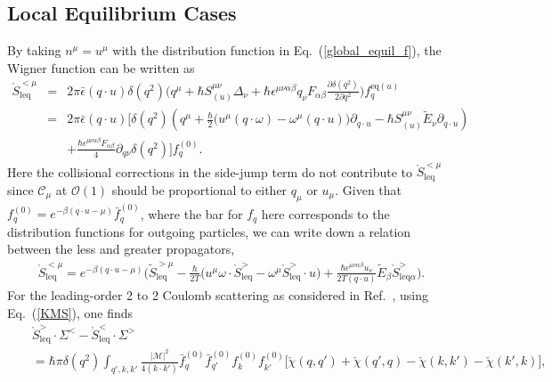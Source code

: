 \documentclass[aps,prd,showkeys,preprint,amsmath,amssymb,nofootinbib]{revtex4-1}
\begin{document}
\subsection{Local Equilibrium Cases}\label{local}
By taking $n^{\mu}=u^{\mu}$ with the distribution function in Eq.~(\ref{global_equil_f}), the Wigner function can be written as
\begin{eqnarray}\label{L_equil_Wigner}\nonumber
	\grave{S}_{\text{leq}}^{<\mu}&=&2\pi\bar{\epsilon}(q\cdot u)\delta(q^2)\Bigg(q^{\mu}
	+\hbar S^{\mu\nu}_{(u)}\Delta_{\nu}
	+\hbar\epsilon^{\mu\nu\alpha\beta}q_{\nu}F_{\alpha\beta}\frac{\partial\delta(q^2)}{2\partial q^2}
	\Bigg)f^{\text{eq}(u)}_q
	\\\nonumber
	&=&2\pi\bar{\epsilon}(q\cdot u)\Bigg[\delta(q^2)\left(q^{\mu}+\frac{\hbar}{2}\big(u^{\mu}(q\cdot\omega)-\omega^{\mu}(q\cdot u)\big)\partial_{q\cdot u}-\hbar S^{\mu\nu}_{(u)}\tilde{E}_{\nu}
	\partial_{q\cdot u}
	\right)
	\\
	&&
	+\frac{\hbar\epsilon^{\mu\nu\alpha\beta}F_{\alpha\beta}}{4}\partial_{q\nu}\delta(q^2)
	\Bigg]f^{(0)}_q.
\end{eqnarray}
Here the collisional corrections in the side-jump term do not contribute to $\grave{S}^{<\mu}_{\text{leq}}$ since $\mathcal{C}_{\mu}$ at $\mathcal{O}(1)$ should be proportional to either $q_{\mu}$ or $u_{\mu}$. 
Given that $f^{(0)}_q=e^{-\beta(q\cdot u-\mu)}\bar{f}^{(0)}_q$, where the bar for $f_q$ here corresponds to the distribution functions for outgoing particles, we can write down a relation between the less and greater propagators,
\begin{eqnarray}\label{KMS}
	\grave{S}_{\text{leq}}^{<\mu}=e^{-\beta(q\cdot u-\mu)}\Bigg(\tilde{S}_{\text{leq}}^{>\mu}-\frac{\hbar}{2T}\Big(u^{\mu}\omega\cdot\grave{S}_{\text{leq}}^{>}-\omega^\mu\grave{S}_{\text{leq}}^{>}\cdot u\Big)
	+\frac{\hbar\epsilon^{\mu\nu\alpha\beta}u_{\nu}}{2T(q\cdot u)}\tilde{E}_{\beta}\grave{S}^>_{\text{leq} \alpha} \Bigg).
\end{eqnarray}
For the leading-order 2 to 2 Coulomb scattering as considered in Ref.~\cite{Hidaka:2016yjf}, using Eq.~(\ref{KMS}), one finds
\begin{eqnarray}\nonumber 
	&&\grave{S}_{\text{leq}}^{>}\cdot\Sigma^<-\grave{S}_{\text{leq}}^{<}\cdot\Sigma^>
	\\
	&&=\hbar\pi\delta(q^2)\int_{q',k,k'}\frac{|\mathcal{M}|^2}{4(k\cdot k')}\bar{f}^{(0)}_q\bar{f}^{(0)}_{q'}f^{(0)}_kf^{(0)}_{k'}
    \Big[\check{\chi}(q,q')+\check{\chi}(q',q)-\check{\chi}(k,k')-\check{\chi}(k',k)\Big], \label{eq:collision}
\end{eqnarray}
\end{document}
